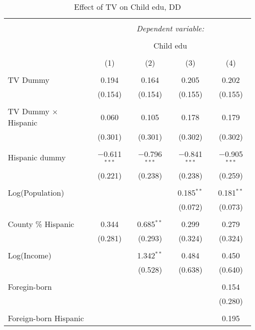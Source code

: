 
\begin{table}[!htbp] \centering 
  \caption{Effect of TV on Child edu, DD} 
  \label{} 
\begin{tabular}{@{\extracolsep{-5pt}}lcccc} 
\\[-1.8ex]\hline 
\hline \\[-1.8ex] 
 & \multicolumn{4}{c}{\textit{Dependent variable:}} \\ 
\cline{2-5} 
\\[-1.8ex] & \multicolumn{4}{c}{Child edu} \\ 
\\[-1.8ex] & (1) & (2) & (3) & (4)\\ 
\hline \\[-1.8ex] 
 TV Dummy & 0.194 & 0.164 & 0.205 & 0.202 \\ 
  & (0.154) & (0.154) & (0.155) & (0.155) \\ 
  & & & & \\ 
 TV Dummy $\times$ Hispanic  & 0.060 & 0.105 & 0.178 & 0.179 \\ 
  & (0.301) & (0.301) & (0.302) & (0.302) \\ 
  & & & & \\ 
 Hispanic dummy & $-$0.611$^{***}$ & $-$0.796$^{***}$ & $-$0.841$^{***}$ & $-$0.905$^{***}$ \\ 
  & (0.221) & (0.238) & (0.238) & (0.259) \\ 
  & & & & \\ 
 Log(Population) &  &  & 0.185$^{**}$ & 0.181$^{**}$ \\ 
  &  &  & (0.072) & (0.073) \\ 
  & & & & \\ 
 County \% Hispanic & 0.344 & 0.685$^{**}$ & 0.299 & 0.279 \\ 
  & (0.281) & (0.293) & (0.324) & (0.324) \\ 
  & & & & \\ 
 Log(Income) &  & 1.342$^{**}$ & 0.484 & 0.450 \\ 
  &  & (0.528) & (0.638) & (0.640) \\ 
  & & & & \\ 
 Foregin-born &  &  &  & 0.154 \\ 
  &  &  &  & (0.280) \\ 
  & & & & \\ 
 Foreign-born Hispanic &  &  &  & 0.195 \\ 

\end{tabular}
\end{table}

